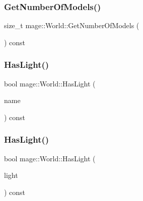 \hypertarget{classmage_1_1_world_a6e04fdde74a2616746cdafd12537c4a7}{}\label{classmage_1_1_world_a6e04fdde74a2616746cdafd12537c4a7} 
\subsubsection{\texorpdfstring{Get\+Number\+Of\+Models()}{GetNumberOfModels()}}
{\footnotesize\ttfamily size\+\_\+t mage\+::\+World\+::\+Get\+Number\+Of\+Models (\begin{DoxyParamCaption}{ }\end{DoxyParamCaption}) const}

\hypertarget{classmage_1_1_world_af83318e3810a5658aa37285df708aa81}{}\label{classmage_1_1_world_af83318e3810a5658aa37285df708aa81} 
\subsubsection{\texorpdfstring{Has\+Light()}{HasLight()}\hspace{0.1cm}{\footnotesize\ttfamily [1/2]}}
{\footnotesize\ttfamily bool mage\+::\+World\+::\+Has\+Light (\begin{DoxyParamCaption}\item[{const string \&}]{name }\end{DoxyParamCaption}) const}

\hypertarget{classmage_1_1_world_ac76eb3df75c68ec28b7a9db9b0576171}{}\label{classmage_1_1_world_ac76eb3df75c68ec28b7a9db9b0576171} 
\subsubsection{\texorpdfstring{Has\+Light()}{HasLight()}\hspace{0.1cm}{\footnotesize\ttfamily [2/2]}}
{\footnotesize\ttfamily bool mage\+::\+World\+::\+Has\+Light (\begin{DoxyParamCaption}\item[{const \hyperlink{namespacemage_a1e01ae66713838a7a67d30e44c67703e}{Shared\+Ptr}$<$ \hyperlink{structmage_1_1_point_light}{Point\+Light} $>$}]{light }\end{DoxyParamCaption}) const}

